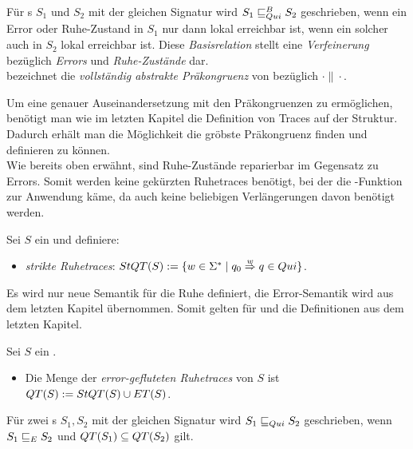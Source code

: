 \begin{Def}
  \label{DefQuiBasisrel}
  Für \EIO{}s $S_1$ und $S_2$ mit der gleichen Signatur wird
  $S_1\sqsubseteq _{Qui}^B S_2$ geschrieben, wenn ein Error oder Ruhe-Zustand in $S_1$ nur
  dann lokal erreichbar ist, wenn ein solcher auch in $S_2$ lokal erreichbar
  ist. Diese \emph{Basisrelation} stellt eine \emph{Verfeinerung} bezüglich
  \emph{Errors} und \emph{Ruhe-Zustände} dar.\\
  \QCRel{} bezeichnet die \emph{vollständig abstrakte Präkongruenz} von
  \QBRel{} bezüglich $\cdot\|\cdot$.
\end{Def}

Um eine genauer Auseinandersetzung mit den Präkongruenzen zu ermöglichen,
benötigt man wie im letzten Kapitel die Definition von Traces auf der Struktur.
Dadurch erhält man die Möglichkeit die gröbste Präkongruenz finden und
definieren zu können.\\
Wie bereits oben erwähnt, sind Ruhe-Zustände reparierbar im Gegensatz zu
Errors. Somit werden keine gekürzten Ruhetraces benötigt, bei der die
\prune{}-Funktion zur Anwendung käme, da auch keine beliebigen Verlängerungen
davon benötigt werden.

\begin{Def}[Ruhetraces]
  \label{DefRuhetraces}
  Sei $S$ ein \EIO{} und definiere:
  \begin{itemize}
    \item \emph{strikte Ruhetraces}: $StQT{}(S) := \{w\in\Sigma ^*\mid q_0
      \overset{w}{\Rightarrow} q\in Qui\}$.
  \end{itemize}
\end{Def}

Es wird nur neue Semantik für die Ruhe definiert, die Error-Semantik wird aus
dem letzten Kapitel übernommen. Somit gelten für \ET{} und \EL{} die
Definitionen aus dem letzten Kapitel.

\begin{Def}
  \label{DefQTQL}
  Sei $S$ ein \EIO{}.
  \begin{itemize}
    \item Die Menge der \emph{error-gefluteten Ruhetraces} von $S$ ist
      $QT{}(S) := StQT{}(S)\cup ET{}(S)$.
  \end{itemize}
  Für zwei \EIO{}s $S_1, S_2$ mit der gleichen Signatur wird
  $S_1\sqsubseteq _{Qui} S_2$ geschrieben, wenn $S_1\sqsubseteq _E S_2$ und $QT{}(S_1)\subseteq
  QT{}(S_2)$ gilt.
\end{Def}

